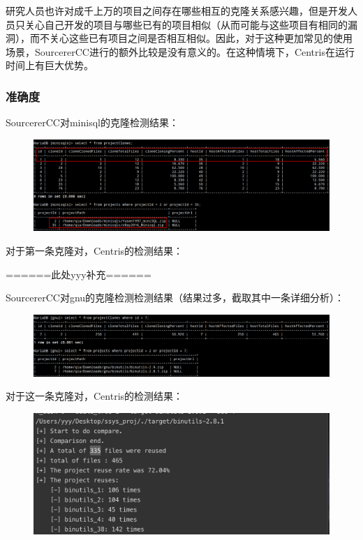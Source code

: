 \documentclass{cjc}
\begin{document}
研究人员也许对成千上万的项目之间存在哪些相互的克隆关系感兴趣，但是开发人员只关心自己开发的项目与哪些已有的项目相似（从而可能与这些项目有相同的漏洞），而不关心这些已有项目之间是否相互相似。因此，对于这种更加常见的使用场景，SourcererCC进行的额外比较是没有意义的。在这种情境下，Centris在运行时间上有巨大优势。

\subsubsection{准确度}

SourcererCC对minisql的克隆检测结果：

\begin{figure}[htb]
  \centering
  \includegraphics[width=\linewidth]{pics/image-20220624184116748.png}
\end{figure}

对于第一条克隆对，Centris的检测结果：

======此处yyy补充======

SourcererCC对gnu的克隆检测检测结果（结果过多，截取其中一条详细分析）：

\begin{figure}[htb]
  \centering
  \includegraphics[width=\linewidth]{pics/SourcererCC gnu.png}
\end{figure}

对于这一条克隆对，Centris的检测结果：

\begin{figure}[htb]
  \centering
  \includegraphics[width=\linewidth]{pics/Centris gnu.jpg}
\end{figure}
\end{document}
